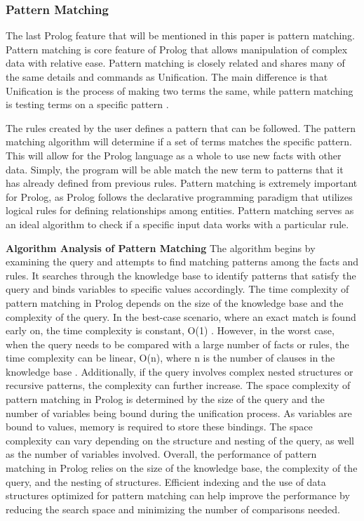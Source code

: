 \documentclass{article}
\theoremstyle{theorem}
\theoremstyle{definition}
\theoremstyle{remark}
\begin{document}
\subsubsection{Pattern Matching}
\noindent\newline The last Prolog feature that will be mentioned in this paper is pattern matching. Pattern matching is core feature of Prolog that allows manipulation of complex data with relative ease. Pattern matching is closely related and shares many of the same details and commands as Unification. The main difference is that Unification is the process of making two terms the same, while pattern matching is testing terms on a specific pattern \cite{(18)}. 

\noindent\newline The rules created by the user defines a pattern that can be followed. The pattern matching algorithm will determine if a set of terms matches the specific pattern. This will allow for the Prolog language as a whole to use new facts with other data. Simply, the program will be able match the new term to patterns that it has already defined from previous rules. Pattern matching is extremely important for Prolog, as Prolog follows the declarative programming paradigm that utilizes logical rules for defining relationships among entities. Pattern matching serves as an ideal algorithm to check if a specific input data works with a particular rule.


\noindent\newline\newline\textbf{Algorithm Analysis of Pattern Matching}
\noindent\newline The algorithm begins by examining the query and attempts to find matching patterns among the facts and rules. It searches through the knowledge base to identify patterns that satisfy the query and binds variables to specific values accordingly. The time complexity of pattern matching in Prolog depends on the size of the knowledge base and the complexity of the query. In the best-case scenario, where an exact match is found early on, the time complexity is constant, O(1) \cite{(19)}. However, in the worst case, when the query needs to be compared with a large number of facts or rules, the time complexity can be linear, O(n), where n is the number of clauses in the knowledge base \cite{(19)}. Additionally, if the query involves complex nested structures or recursive patterns, the complexity can further increase. The space complexity of pattern matching in Prolog is determined by the size of the query and the number of variables being bound during the unification process. As variables are bound to values, memory is required to store these bindings. The space complexity can vary depending on the structure and nesting of the query, as well as the number of variables involved. Overall, the performance of pattern matching in Prolog relies on the size of the knowledge base, the complexity of the query, and the nesting of structures. Efficient indexing and the use of data structures optimized for pattern matching can help improve the performance by reducing the search space and minimizing the number of comparisons needed.
\end{document}
